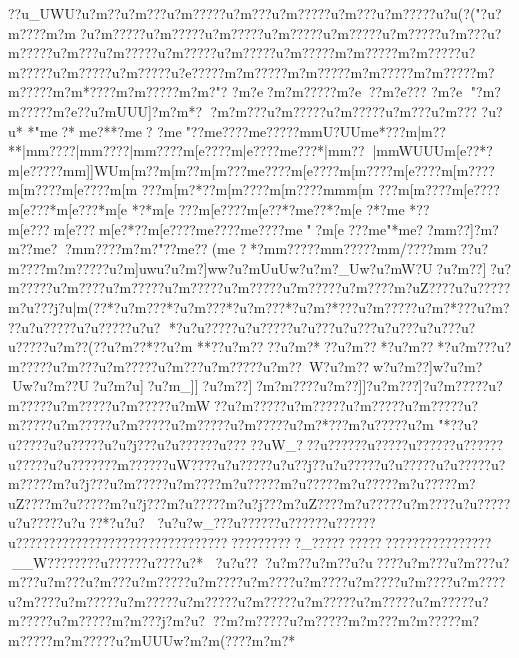 {{{{{{{{{{{{{{{{{{{{{{{{{{{{{{{{{{{{{{{{{{{{{{{{{{{{{{{{{{{{{{{{{{{{{{{{{{{{{{{{{{{{{{{{{{{{{{{{{{{{{{{{{{{{{{{{{{{{{{{{{{{{{{{{{{{{{{{{{{{{{{{{{{{{{{{{{{{{{{{{{{{{{{{{{{{{{{{{{{{{{{{{{{{{{{{{{{{{{{{{{{{{{{{{{{{{{{{{{{{{{{{{{{{{{{{{{{{{{{{{{{{{{{{{{{{{{{{{{{{{{{{{{{{{{{{{{{{{{{{{{{{{{{{{{{{{{{{{{{{{{{{{{{{{{{{{{{{{{{{{{{{{{{{{{{{{{{{{{{{{{{{{{{{{{{{{{{{{{{{{{{{{{{{{{{{{{{{{{{{{{{{{{{{{{{{{{{{{{{{{{{{{{{{{{{{{{{{{{{{{{{{{{{{{{{{{{{{{{{{{{{{{{{?}?u_UWU?u?m  ? ?u?m ?? ?u?m?????u?m???u?m?????u?m???u?m?????u?u(?("?u?m????m?m   ?u?m?????u?m?????u?m?????u?m?????u?m?????u?m?????u?m???u?m?????u?m???u?m?????u?m?????u?m?????u?m?????m?m?????m?m?????u?m?????u?m?????u?m?????u?e?????m?m?????m?m?????m?m?????m?m?????m?m?????m?m*????m?m?????m?m?"?
?m?e   ?m?m?????m?e ??m?e??? ?m?e  "?m?m?????m?e?   ?u?mUUU]?m?m*?
?m?m???u?m?????u?m?????u?m???u?m???
?u?u*
*"{m{e?*{m{e?**?{m{e?
?{m{e"??{m{e????{m{e?????m{mU?UU{m{e*???{m|m??**|m{m????|m{m????|m{m????{m[e????{m|e????{m{e???*|m{m??|m{mWUUU{m[e??*?{m|e?????m{m]]WU{m[m  ??{m[m  ??{m[m ???{m{e????{m[e????{m[m????{m[e????{m[m????{m[m????{m[e????{m[m
???{m[m?*??{m[m????{m[m????{m{m    {m[m
???{m[m????{m[e????{m[e???*{m[e???*{m[e
*?*{m[e
???{m[e????{m[e??*?{m{e??*?{m[e
?*?{m{e
*??{m[e???{m[e???{m[e?*??{m[e????{m{e????{m{e????{m{e"?{m[e
???{m{e  "*{m{e?  ?m{m??]?{m?m??  {m{e? ?m{m????{m?m?"??{m{e??({m{e
?*?m{m?????m{m?????m{m/????m{m ??u?m????m?m?????u?m]uwu?u?m?]ww?u?mUuUw?u?m?_Uw?u?mW?U?u?m??]?u?m?????u?m????u?m?????u?m?????u?m?????u?m?????u?m????m?uZ????u?u?????m?u???j?u|m(??*?u?m???*?u?m???*?u?m???*?u?m?*???u?m?????u?m?*???u?m? 
??u?u?????u?u?????u?u?
*?u?u?????u?u?????u?u???u?u???u?u???u?u???u?u?????u?m??(??u?m??*??u?m
**??u?m????u?m?*??u?m??*?u?m??*?u?m???u?m?????u?m???u?m?????u?m???u?m?????u?m??~W?u?m??w?u?m??]w?u?m?Uw?u?m??U?u?m?u]?u?m_]]?u?m??]?m?m????u?m??]]?u?m???]?u?m?????u?m?????u?m?????u?m?????u?mW{??u?m?????u?m?????u?m?????u?m?????u?m?????u?m?????u?m?????u?m?????u?m?????u?m?*???m?u?????u?m
"*??u?u?????u?u?????u?u?j???u?u?????}?u????}?uW_??}?u?????}?u????}?u?????}?u?????}?u?????u?u???????m?????}?uW????u?u?????u?u??j??u?u?????u?u?????u?u?????u?m?????m?u?j???u?m?????u?m????m?u?????m?u?????m?u?????m?u?????m?uZ????m?u?????m?u?j???m?u?????m?u?j???m?uZ????m?u?????u?m????u?u?????u?u?????u?u??*?u?u?
?u?u?w_??}?u?????}?u?????}?u?????}?u?????}?}???????}???????}??????????????????????_????????????????????} ??????}__W?}?}?????}?u?????}?u????u?}*
?u?u???u?m ?  ?u?m ?  ?u?u????u?m???u?m???u?m???u?m???u?m???u?m?????u?m????u?m????u?m????u?m????u?m????u?m????u?m????u?m?????u?m?????u?m?????u?m?????u?m?????u?m?????u?m?????u?m?????u?m?????m?m???j?m?u???m?m?????u?m?????m?m???m?m?????m?m?????m?m?????u?mUUUw?m?m(????m?m?*
}}}}}}}}}}}}}}}}}}}}}}}}}}}}}}}}}}}}}}}}}}}}}}}}}}}}}}}}}}}}}}}}}}}}}}}}}}}}}}}}}}}}}}}}}}}}}}}}}}}}}}}}}}}}}}}}}}}}}}}}}}}}}}}}}}}}}}}}}}}}}}}}}}}}}}}}}}}}}}}}}}}}}}}}}}}}}}}}}}}}}}}}}}}}}}}}}}}}}}}}}}}}}}}}}}}}}}}}}}}}}}}}}}}}}}}}}}}}}}}}}}}}}}}}}}}}}}}}}}}}}}}}}}}}}}}}}}}}}}}}}}}}}}}}}}}}}}}}}}}}}}}}}}}}}}}}}}}}}}}}}}}}}}}}}}}}}}}}}}}}}}}}}}}}}}}}}}}}}}}}}}}}}}}}}}}}}}}}}}}}}}}}}}}}}}}}}}}}}}}}}}}}}}}}}}}}}}}}}}}}}}}}}}}}}}}}}}}}}}}}}}}}}}}}}}}}}}}}}}}}}}}}}}}}}}}}}}}}}}}}}}}}}}}}}}}}}}}}}}}}}}}}}}}}}}}
